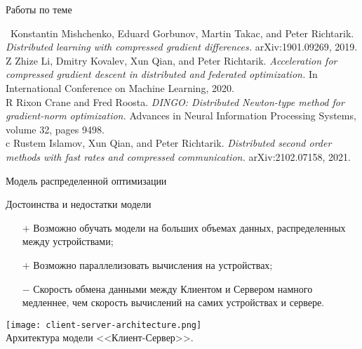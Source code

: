 \documentclass[aspectratio=169,xcolor=dvipsnames]{beamer}
\begin{document}
\begin{frame}{Работы по теме}
    \begin{thebibliography}{99} %
    
    \bibitem \ Konstantin Mishchenko, Eduard Gorbunov, Martin Takac, and Peter Richtarik. 
    \newblock \textit{Distributed learning with compressed gradient differences.}
    \newblock arXiv:1901.09269, 2019.
    \\
    \bibitem Z Zhize Li, Dmitry Kovalev, Xun Qian, and Peter Richtarik.
    \newblock \textit{Acceleration for compressed
gradient descent in distributed and federated optimization.}
    \newblock In International Conference on Machine Learning, 2020.
    \\
    \bibitem R Rixon Crane and Fred Roosta.
    \newblock \textit{DINGO: Distributed Newton-type method
for gradient-norm optimization.}
    \newblock Advances in Neural Information Processing Systems, volume 32, pages 9498.
    \\
    \bibitem c Rustem Islamov, Xun Qian, and Peter Richtarik.
    \newblock \textit{Distributed second order methods
with fast rates and compressed communication.}
    \newblock arXiv:2102.07158, 2021.


\end{thebibliography}
\end{frame}

\begin{frame}{Модель распределенной оптимизации}
\begin{minipage}[h]{0.65\linewidth}
\begin{block}{Достоинства и недостатки модели}
    \begin{itemize}
        \item[$+$] Возможно обучать модели на больших объемах данных, распределенных между устройствами;
        \item[$+$] Возможно параллелизовать вычисления на устройствах;
        \item[$-$] Скорость обмена данными между Клиентом и Сервером намного медленнее, чем скорость вычислений на самих устройствах и сервере.
    \end{itemize}
\end{block}
\end{minipage}
\hfill
\begin{minipage}[h]{0.32\linewidth}
\begin{center}
\texttt{[image: client-server-architecture.png]}\\
{\scriptsize Архитектура модели <<Клиент-Сервер>>.}
\end{center}
\end{minipage}


\end{frame}
\end{document}

